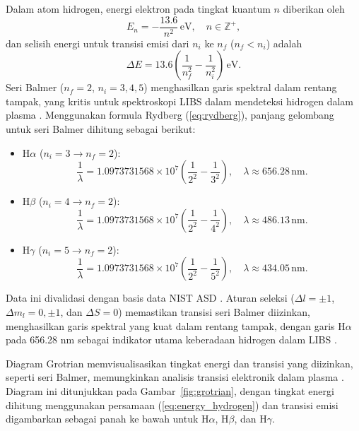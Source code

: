 Dalam atom hidrogen, energi elektron pada tingkat kuantum \( n \) diberikan oleh
\begin{equation}
E_n = -\frac{13.6}{n^2} \, \text{eV}, \quad n \in \mathbb{Z}^+, \label{eq:energy_hydrogen}
\end{equation}
dan selisih energi untuk transisi emisi dari \( n_i \) ke \( n_f \) (\( n_f < n_i \)) adalah
\begin{equation}
\Delta E = 13.6 \left( \frac{1}{n_f^2} - \frac{1}{n_i^2} \right) \, \text{eV}. \label{eq:bab2_eq3}
\end{equation}
Seri Balmer (\( n_f = 2 \), \( n_i = 3, 4, 5 \)) menghasilkan garis spektral dalam rentang tampak, yang kritis untuk spektroskopi LIBS dalam mendeteksi hidrogen dalam plasma \citep{CremersRadzemski2013}. Menggunakan formula Rydberg (\ref{eq:rydberg}), panjang gelombang untuk seri Balmer dihitung sebagai berikut:
\begin{itemize}
    \item H\(\alpha\) (\( n_i = 3 \to n_f = 2 \)):
    \[
    \frac{1}{\lambda} = 1.0973731568 \times 10^7 \left( \frac{1}{2^2} - \frac{1}{3^2} \right), \quad \lambda \approx 656.28 \, \text{nm}.
    \]
    \item H\(\beta\) (\( n_i = 4 \to n_f = 2 \)):
    \[
    \frac{1}{\lambda} = 1.0973731568 \times 10^7 \left( \frac{1}{2^2} - \frac{1}{4^2} \right), \quad \lambda \approx 486.13 \, \text{nm}.
    \]
    \item H\(\gamma\) (\( n_i = 5 \to n_f = 2 \)):
    \[
    \frac{1}{\lambda} = 1.0973731568 \times 10^7 \left( \frac{1}{2^2} - \frac{1}{5^2} \right), \quad \lambda \approx 434.05 \, \text{nm}.
    \]
\end{itemize}
Data ini divalidasi dengan basis data NIST ASD \citep{Kramida2023}. Aturan seleksi (\( \Delta l = \pm 1 \), \( \Delta m_l = 0, \pm 1 \), dan \( \Delta S = 0 \)) memastikan transisi seri Balmer diizinkan, menghasilkan garis spektral yang kuat dalam rentang tampak, dengan garis H\(\alpha\) pada 656.28 nm sebagai indikator utama keberadaan hidrogen dalam LIBS \citep{CremersRadzemski2013}.

Diagram Grotrian memvisualisasikan tingkat energi dan transisi yang diizinkan, seperti seri Balmer, memungkinkan analisis transisi elektronik dalam plasma \citep{Mason2015}. Diagram ini ditunjukkan pada Gambar~\ref{fig:grotrian}, dengan tingkat energi dihitung menggunakan persamaan (\ref{eq:energy_hydrogen}) dan transisi emisi digambarkan sebagai panah ke bawah untuk H\(\alpha\), H\(\beta\), dan H\(\gamma\).

